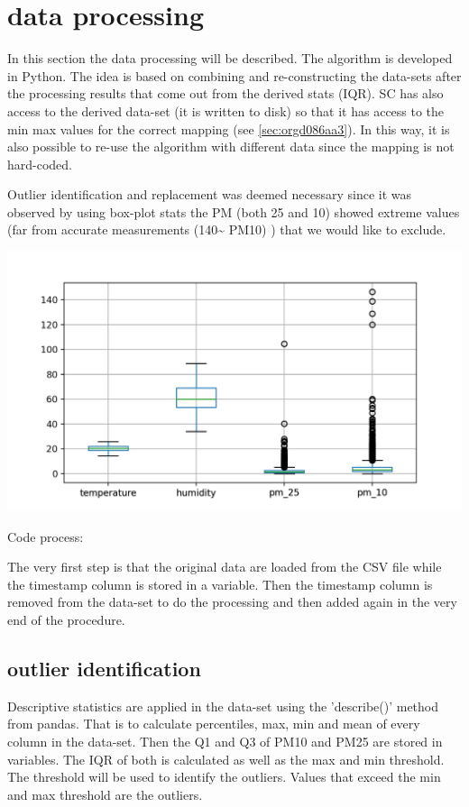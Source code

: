 \documentclass[11pt]{article}
\begin{document}
\section{data processing}
\label{sec:orgb9f3ab1}
In this section the data processing will be described.  The algorithm is developed in Python.  The idea is based on combining and re-constructing the data-sets after the processing results that come out from the derived stats (IQR).  SC has also access to the derived data-set (it is written to disk) so that it has access to the min max values for the correct mapping (see \ref{sec:orgd086aa3}).  In this way, it is also possible to re-use the algorithm with different data since the mapping is not hard-coded.

Outlier identification and replacement was deemed necessary since it was observed by using box-plot stats the PM (both 25 and 10) showed extreme values (far from accurate measurements (140\textasciitilde{} PM10) ) that we would like to exclude.

\begin{center}
\includegraphics[width=.9\linewidth]{./boxplot.png}
\end{center}

Code process:

The very first step is that the original data are loaded from the CSV file while the timestamp column is stored in a variable.  Then the timestamp column is removed from the data-set to do the processing and then added again in the very end of the procedure.

\subsection{outlier identification}
\label{sec:orgbc7c096}
Descriptive statistics are applied in the data-set using the 'describe()' method from pandas.  That is to calculate percentiles, max, min and mean of every column in the data-set.  Then the Q1 and Q3 of PM10 and PM25 are stored in variables.  The IQR of both is calculated as well as the max and min threshold.  The threshold will be used to identify the outliers.  Values that exceed the min and max threshold are the outliers.
\end{document}
